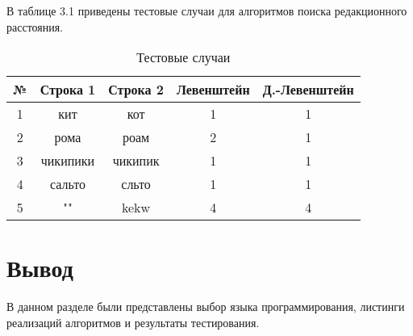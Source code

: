 В таблице 3.1 приведены тестовые случаи для алгоритмов поиска редакционного расстояния.

\begin{table}[H]
	\begin{center}
    	\captionsetup{singlelinecheck = false, justification=centering}
		\caption{Тестовые случаи}
		\begin{tabular}{c|c|c|c|c}
			№ & Строка 1 & Строка 2 & Левенштейн & Д.-Левенштейн\\
			\hline
			1 & кит & кот & 1 & 1\\
			2 & рома & роам & 2 & 1\\
			3 & чикипики & чикипик & 1 & 1\\
			4 & сальто & сльто & 1 & 1\\
			5 & "" & kekw & 4 & 4\\
		\end{tabular}
	\end{center}
\end{table}

\section{Вывод}

В данном разделе были представлены выбор языка программирования, листинги реализаций алгоритмов и результаты тестирования.